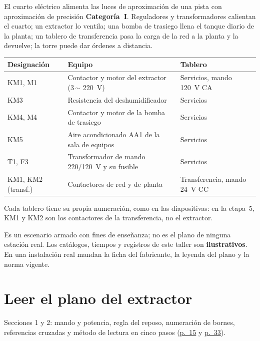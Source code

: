 \documentclass[11pt,a4paper]{article}
\newcommand{\pdfpag}[1]{\href{https://github.com/marcoteran/atsep-energy-control-labs/raw/refs/heads/master/presentaciones/marcoteran_energy_electriccontroland_wiredlogyc.pdf\#page=#1}{p.~#1}}
\begin{document}
El cuarto eléctrico alimenta las luces de aproximación de una pista con aproximación de precisión \textbf{Categoría~I}. Reguladores y transformadores calientan el cuarto; un extractor lo ventila; una bomba de trasiego llena el tanque diario de la planta; un tablero de transferencia pasa la carga de la red a la planta y la devuelve; la torre puede dar órdenes a distancia.

\begin{center}\small\renewcommand{\arraystretch}{1.2}
\begin{tabularx}{\linewidth}{@{}l L l@{}}
\toprule
\textbf{Designación} & \textbf{Equipo} & \textbf{Tablero}\\
\midrule
KM1, M1 & Contactor y motor del extractor (3\,$\sim$ \SI{220}{V}) & Servicios, mando \SI{120}{V} CA\\
KM3 & Resistencia del deshumidificador & Servicios\\
KM4, M4 & Contactor y motor de la bomba de trasiego & Servicios\\
KM5 & Aire acondicionado AA1 de la sala de equipos & Servicios\\
T1, F3 & Transformador de mando 220/\SI{120}{V} y su fusible & Servicios\\
KM1, KM2 (transf.) & Contactores de red y de planta & Transferencia, mando \SI{24}{V} CC\\
\bottomrule
\end{tabularx}
\end{center}

Cada tablero tiene su propia numeración, como en las diapositivas: en la etapa~5, KM1 y KM2 son los contactores de la transferencia, no el extractor.

\begin{alerta}
Es un escenario armado con fines de enseñanza; no es el plano de ninguna estación real. Los catálogos, tiempos y registros de este taller son \textbf{ilustrativos}. En una instalación real mandan la ficha del fabricante, la leyenda del plano y la norma vigente.
\end{alerta}

\section{Leer el plano del extractor}

\begin{curso}
Secciones 1 y 2: mando y potencia, regla del reposo, numeración de bornes, referencias cruzadas y método de lectura en cinco pasos (\pdfpag{15} y \pdfpag{33}).
\end{curso}
\end{document}
